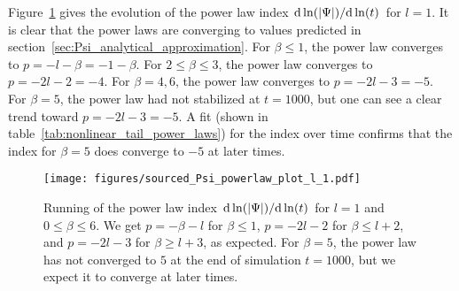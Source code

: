 \documentclass[reprint,aps,physrev,superscriptaddress,10pt,notitlepage,prd,nofootinbib,onecolumn]{revtex4-2}
\newcommand{\Fref}[1]{Figure~\ref{#1}}
\newcommand{\tref}[1]{table~\ref{#1}}
\newcommand{\sref}[1]{section~\ref{#1}}
\begin{document}
\Fref{fig:sourced_Psi_powerlaw} gives the evolution of the power law index $\dv*{\ln(|\Psi|)}{\ln(t)}$ for $l=1$.
It is clear that the power laws are converging to values predicted in \sref{sec:Psi_analytical_approximation}.
For $\beta \leq 1$, the power law converges to $p=-l-\beta = -1-\beta$.
For $2 \leq \beta \leq 3$, the power law converges to $p=-2l-2=-4$.
For $\beta = 4,6$, the power law converges to $p=-2l-3=-5$.
For $\beta=5$, the power law had not stabilized at $t=1000$, but one can see a clear trend toward $p=-2l-3=-5$.
A fit (shown in \tref{tab:nonlinear_tail_power_laws}) for the index over time confirms that the index for $\beta=5$ does converge to $-5$ at later times.
\begin{figure}[t]
  \centering \texttt{[image: figures/sourced\_Psi\_powerlaw\_plot\_l\_1.pdf]}
  \caption{Running of the power law index $\dv*{\ln(|\Psi|)}{\ln(t)}$ for $l=1$ and $0 \leq \beta \leq 6$.
    We get $p=-\beta-l$ for $\beta \leq 1$, $p=-2l-2$ for $\beta \leq l+2$, and $p=-2l-3$ for $\beta \geq l+3$, as expected.
    For $\beta=5$, the power law has not converged to $5$ at the end of simulation $t=1000$, but we expect it to converge at later times.}
  \label{fig:sourced_Psi_powerlaw}
\end{figure}
\end{document}
